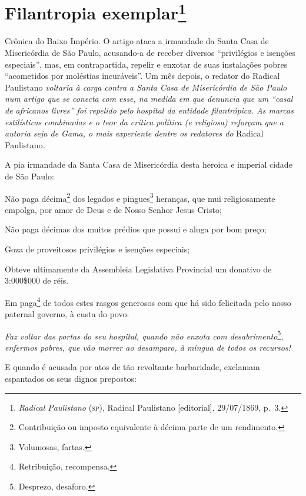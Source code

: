 \chapter{Filantropia exemplar\footnote{\emph{Radical Paulistano} (\textsc{sp}),
  Radical Paulistano {[}editorial{]}, 29/07/1869, p.~3.}}

\begin{didascalia}
Crônica do Baixo Império. O artigo ataca a irmandade da Santa Casa de
Misericórdia de São Paulo, acusando-a de receber diversos ``privilégios e
isenções especiais'', mas, em contrapartida, repelir e enxotar de suas
instalações pobres ``acometidos por moléstias incuráveis''. Um mês depois,
o redator do Radical Paulistano \emph{voltaria à carga contra a Santa
Casa de Misericórdia de São Paulo num artigo que se conecta com esse, na
medida em que denuncia que um ``casal de africanos livres'' foi repelido
pelo hospital da entidade filantrópica. As marcas estilísticas
combinadas e o teor da crítica política (e religiosa) reforçam que a
autoria seja de Gama, o mais experiente dentre os redatores do} Radical
Paulistano\emph{.}
\end{didascalia}



A pia irmandade da Santa Casa de Misericórdia desta heroica e imperial
cidade de São Paulo:

Não paga décima\footnote{Contribuição ou imposto equivalente à décima
  parte de um rendimento.} dos legados e pingues\footnote{Volumosas,
  fartas.} heranças, que mui religiosamente empolga, por amor de Deus e
de Nosso Senhor Jesus Cristo;

Não paga décimas dos muitos prédios que possui e aluga por bom preço;

Goza de proveitosos privilégios e isenções especiais;

Obteve ultimamente da Assembleia Legislativa Provincial um donativo de
3:000\$000 de réis.

Em paga\footnote{Retribuição, recompensa.} de todos estes rasgos
generosos com que há sido felicitada pelo nosso paternal governo, à
custa do povo:

\emph{Faz voltar das portas do seu hospital, quando não enxota com
desabrimento}\footnote{Desprezo, desaforo.}\emph{,} \emph{enfermos
pobres, que vão morrer ao desamparo, à míngua de todos os recursos!}

E quando é acusada por atos de tão revoltante barbaridade, exclamam
espantados os seus dignos prepostos:


